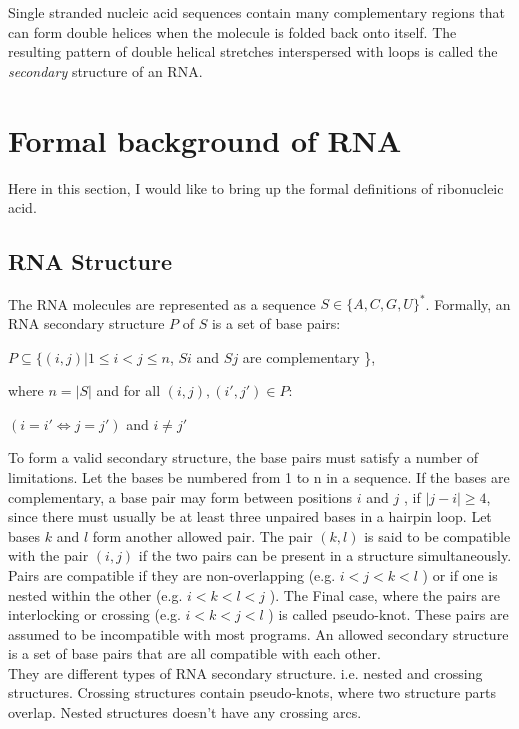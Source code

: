\documentclass[twoside,a4paper]{report}
\begin{document}
	Single stranded nucleic acid sequences contain many complementary regions that can form double helices when the molecule is folded back onto itself. The resulting pattern of double helical stretches interspersed with loops is called the \textit{secondary} structure of an RNA.\\
	
	\section{Formal background of RNA}
	Here in this section, I would like to bring up the formal definitions of ribonucleic acid.
	\subsection{RNA Structure}
	The RNA molecules are represented as a sequence $S \in \{A, C, G, U\} ^*$.
	Formally, an RNA secondary structure $P$ of $S$ is a set of base pairs:\\
	\begin{center}
	 $ P \subseteq \{(i, j) | 1 \leq i < j \leq n $, $ Si $ and $Sj$ are complementary \},\\
	\end{center}
	where $ n = |S| $ and for all $(i, j) , ( i', j' ) \in  P:$\\
	\begin{center}
	$(i = i' \Leftrightarrow j = j')$ and $ i \neq j'$ \\
	\end{center}

	To form a valid secondary structure, the base pairs must satisfy a number of limitations. Let the bases be numbered from 1 to n in a sequence. If the bases are complementary, a base pair may form between positions $i$ and $j$ ,  if $|j - i | \geq 4$, since there must usually be at least three unpaired bases in a hairpin loop. Let bases $k$ and $l$ form another allowed pair. The pair $(k,l)$ is said to be compatible with the pair $(i,j)$ if the two pairs can be present in a structure simultaneously. Pairs are compatible if they are non-overlapping (e.g. $i<j<k<l$ ) or if one is nested within the other (e.g. $i<k<l<j$ ). The Final case, where the pairs are interlocking or crossing (e.g. $i<k<j<l$ ) is called  pseudo-knot. These pairs are assumed to be incompatible with
	most programs. An allowed secondary structure is a set of base pairs that are all compatible with each other.\\
	
	They are different types of RNA secondary structure. i.e. nested
	and crossing structures. Crossing structures contain pseudo-knots, where two structure parts overlap. Nested structures doesn't have any crossing arcs.\\
	
\end{document}

